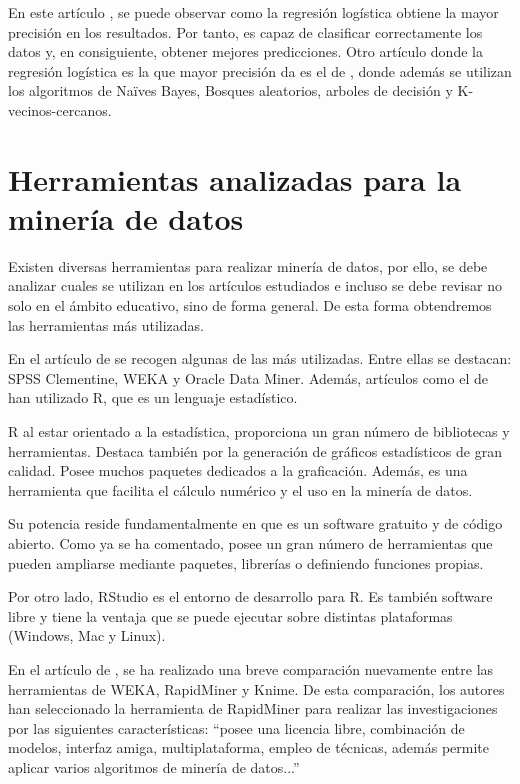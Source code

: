 En este artículo , se puede observar como la regresión logística obtiene la mayor precisión en los resultados. Por tanto, es capaz de clasificar correctamente los datos y, en consiguiente, obtener mejores predicciones. Otro artículo donde la regresión logística es la que mayor precisión da es el de , donde además se utilizan los algoritmos de Naïves Bayes, Bosques aleatorios, arboles de decisión y K-vecinos-cercanos.



\section{Herramientas analizadas para la minería de datos}
Existen diversas herramientas para realizar minería de datos, por ello, se debe analizar cuales se utilizan en los artículos estudiados e incluso se debe revisar no solo en el ámbito educativo, sino de forma general. De esta forma obtendremos las herramientas más utilizadas.

En el artículo de  se recogen algunas de las más utilizadas. Entre ellas se destacan: SPSS Clementine, WEKA y Oracle Data Miner. Además, artículos como el de  han utilizado R, que es un lenguaje estadístico.

R al estar orientado a la estadística, proporciona un gran número de bibliotecas y herramientas. Destaca también por la generación de gráficos estadísticos de gran calidad. Posee muchos paquetes dedicados a la graficación. Además, es una herramienta que facilita el cálculo numérico y el uso en la minería de datos. \cite{emanuel2014}

Su potencia reside fundamentalmente en que es un software gratuito y de código abierto. Como ya se ha comentado, posee un gran número de herramientas que pueden ampliarse mediante paquetes, librerías o definiendo funciones propias.

Por otro lado, RStudio es el entorno de desarrollo para R. Es también software libre y tiene la ventaja que se puede ejecutar sobre distintas plataformas (Windows, Mac y Linux).

En el artículo de , se ha realizado una breve comparación nuevamente entre las herramientas de WEKA, RapidMiner y Knime. De esta comparación, los autores han seleccionado la herramienta de RapidMiner para realizar las investigaciones por las siguientes características: ``posee una licencia libre, combinación de modelos, interfaz amiga, multiplataforma, empleo de técnicas, además permite aplicar varios algoritmos de minería de datos...'' \cite{jaramillo2015aplicacion}

